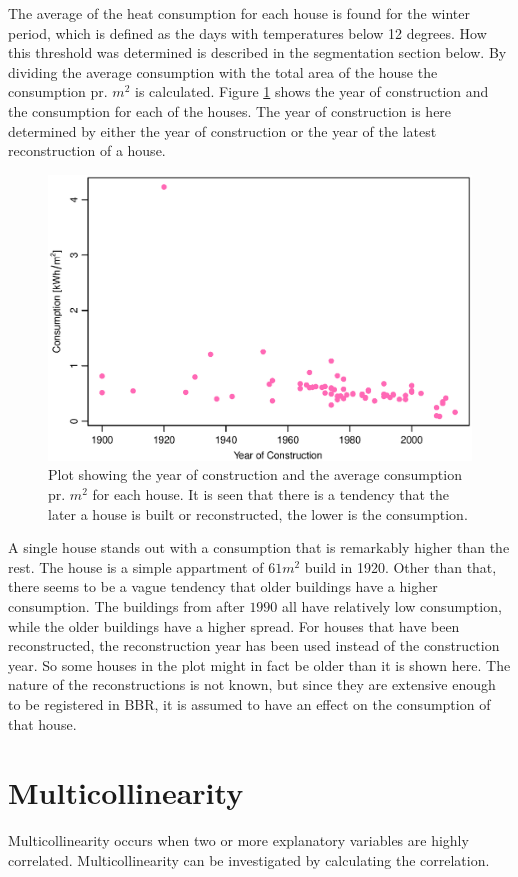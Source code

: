 \noindent The average of the heat consumption for each house is found for the winter period, which is defined as the days with temperatures below 12 degrees. How this threshold was determined is described in the segmentation section below. By dividing the average consumption with the total area of the house the consumption pr. $m^2$ is calculated. Figure \ref{fig: byggeaar} shows the year of construction and the consumption for each of the houses. The year of construction is here determined by either the year of construction or the year of the latest reconstruction of a house. 
\begin{figure}[H]
    \centering
    \includegraphics[width=.8\textwidth]{../../../figures/byggeaar.eps}
    \caption{Plot showing the year of construction and the average consumption pr. $m^2$ for each house. It is seen that there is a tendency that the later a house is built or reconstructed, the lower is the consumption.}
    \label{fig: byggeaar}
\end{figure}
\noindent A single house stands out with a consumption that is remarkably higher than the rest. The house is a simple appartment of $61 m^2$ build in 1920. Other than that, there seems to be a vague tendency that older buildings have a higher consumption. The buildings from after $1990$ all have relatively low consumption, while the older buildings have a higher spread. For houses that have been reconstructed, the reconstruction year has been used instead of the construction year. So some houses in the plot might in fact be older than it is shown here. The nature of the reconstructions is not known, but since they are extensive enough to be registered in BBR, it is assumed to have an effect on the consumption of that house.

\section{Multicollinearity}
Multicollinearity occurs when two or more explanatory variables are highly correlated. Multicollinearity can be investigated by calculating the correlation.\\

